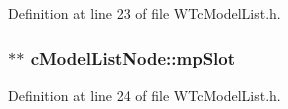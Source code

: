 Definition at line 23 of file WTcModelList.h.

\hypertarget{classc_model_list_node_af6e6813a26fce02b37dc9fabeab059e6}{
\subsubsection[{mpSlot}]{$\ast$$\ast$ {\bf cModelListNode::mpSlot}}}
\label{classc_model_list_node_af6e6813a26fce02b37dc9fabeab059e6}


Definition at line 24 of file WTcModelList.h.

